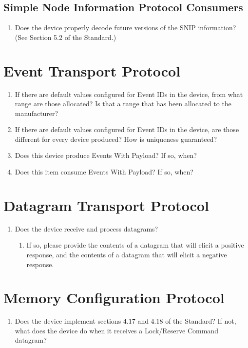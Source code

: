     \subsection{Simple Node Information Protocol Consumers}
        \begin{enumerate}
            \item Does the device properly decode future versions of the SNIP
                information? (See Section 5.2 of the Standard.)
        \end{enumerate}

\section{Event Transport Protocol}
    \begin{enumerate}
        \item If there are default values configured for Event IDs in the device,
            from what range are those allocated? Is that a range that has been
            allocated to the manufacturer?
        \item  If there are default values configured for Event IDs in the device,
            are those different for every device produced? How is uniqueness
            guaranteed?
        \item Does this device produce Events With Payload?  If so, when?
        \item Does this item consume Events With Payload?  If so, when?
    \end{enumerate}

\section{Datagram Transport Protocol}
    \begin{enumerate}
        \item Does the device receive and process datagrams?
            \begin{enumerate}
                \item If so, please provide the contents of a datagram that
                    will elicit a positive response, and the contents of a 
                    datagram that will elicit a negative response.
            \end{enumerate}
    \end{enumerate}

\section{Memory Configuration Protocol}
    \begin{enumerate}
        \item Does the device implement sections 4.17 and 4.18 of the Standard?
              If not, what does the device do when it receives a Lock/Reserve Command 
              datagram?
    \end{enumerate}

